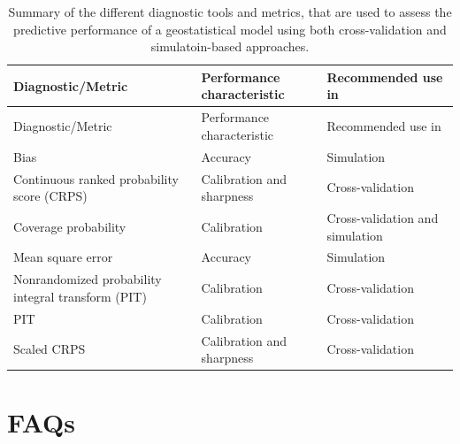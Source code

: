 \documentclass[
  letterpaper,
]{krantz}
\begin{document}
\begin{longtable}[]{@{}
  >{\raggedright\arraybackslash}p{}
  >{\raggedright\arraybackslash}p{}
  >{\raggedright\arraybackslash}p{}@{}}
\caption{Summary of the different diagnostic tools and metrics, that are
used to assess the predictive performance of a geostatistical model
using both cross-validation and simulatoin-based
approaches.}\label{tbl-summary-pp-diag}\tabularnewline
\toprule\noalign{}
\begin{minipage}[b]{\linewidth}\raggedright
Diagnostic/Metric
\end{minipage} & \begin{minipage}[b]{\linewidth}\raggedright
Performance characteristic
\end{minipage} & \begin{minipage}[b]{\linewidth}\raggedright
Recommended use in
\end{minipage} \\
\midrule\noalign{}
\endfirsthead
\toprule\noalign{}
\begin{minipage}[b]{\linewidth}\raggedright
Diagnostic/Metric
\end{minipage} & \begin{minipage}[b]{\linewidth}\raggedright
Performance characteristic
\end{minipage} & \begin{minipage}[b]{\linewidth}\raggedright
Recommended use in
\end{minipage} \\
\midrule\noalign{}
\endhead
\bottomrule\noalign{}
\endlastfoot
Bias & Accuracy & Simulation \\
Continuous ranked probability score (CRPS) & Calibration and sharpness &
Cross-validation \\
Coverage probability & Calibration & Cross-validation and simulation \\
Mean square error & Accuracy & Simulation \\
Nonrandomized probability integral transform (PIT) & Calibration &
Cross-validation \\
PIT & Calibration & Cross-validation \\
Scaled CRPS & Calibration and sharpness & Cross-validation \\
\end{longtable}

\section{FAQs}\label{faqs}
\end{document}
